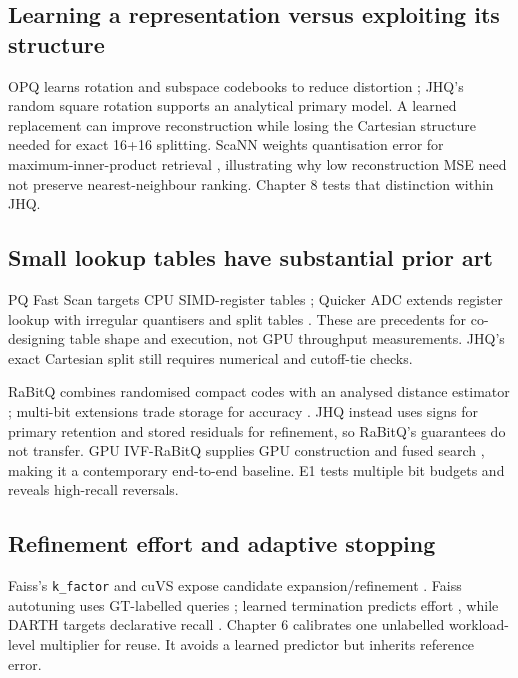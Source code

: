 \subsection{Learning a representation versus exploiting its structure}

OPQ learns rotation and subspace codebooks to reduce distortion
\cite{opq}; JHQ's random square rotation supports an analytical primary
model. A learned replacement can improve reconstruction while losing the
Cartesian structure needed for exact 16+16 splitting.
ScaNN weights quantisation error for maximum-inner-product retrieval
\cite{scann}, illustrating why low reconstruction MSE need not preserve
nearest-neighbour ranking. Chapter 8 tests that distinction within JHQ.

\subsection{Small lookup tables have substantial prior art}

PQ Fast Scan targets CPU SIMD-register tables \cite{fastscan};
Quicker ADC extends register lookup with irregular quantisers and split
tables \cite{quickeradc}. These are precedents for co-designing table
shape and execution, not GPU throughput measurements. JHQ's exact
Cartesian split still requires numerical and cutoff-tie checks.

RaBitQ combines randomised compact codes with an analysed distance
estimator \cite{rabitq}; multi-bit extensions trade storage for accuracy
\cite{rabitq_multi}. JHQ instead uses signs for primary retention and
stored residuals for refinement, so RaBitQ's guarantees do not transfer.
GPU IVF-RaBitQ supplies GPU construction and fused search
\cite{ivfrabitq}, making it a contemporary end-to-end baseline. E1 tests
multiple bit budgets and reveals high-recall reversals.

\subsection{Refinement effort and adaptive stopping}

Faiss's \texttt{k\_factor} and cuVS expose candidate expansion/refinement
\cite{faiss_refine,cuvs_refinement}. Faiss autotuning uses GT-labelled
queries \cite{faiss_autotune}; learned termination predicts effort
\cite{li_termination}, while DARTH targets declarative recall
\cite{darth}. Chapter 6 calibrates one unlabelled workload-level multiplier
for reuse. It avoids a learned predictor but inherits reference error.
